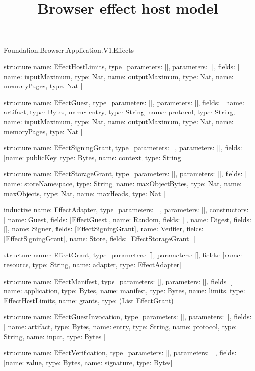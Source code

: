 \begin{lexlean}{Foundation.Browser.Application.V1.Effects}
\title{Browser effect host model}
\begin{semanticmodule}
structure{
  name: EffectHostLimits,
  type_parameters: [],
  parameters: [],
  fields: [
    {name: inputMaximum, type: Nat},
    {name: outputMaximum, type: Nat},
    {name: memoryPages, type: Nat}
  ]
}

structure{
  name: EffectGuest,
  type_parameters: [],
  parameters: [],
  fields: [
    {name: artifact, type: Bytes},
    {name: entry, type: String},
    {name: protocol, type: String},
    {name: inputMaximum, type: Nat},
    {name: outputMaximum, type: Nat},
    {name: memoryPages, type: Nat}
  ]
}

structure{
  name: EffectSigningGrant,
  type_parameters: [],
  parameters: [],
  fields: [{name: publicKey, type: Bytes}, {name: context, type: String}]
}

structure{
  name: EffectStorageGrant,
  type_parameters: [],
  parameters: [],
  fields: [
    {name: storeNamespace, type: String},
    {name: maxObjectBytes, type: Nat},
    {name: maxObjects, type: Nat},
    {name: maxHeads, type: Nat}
  ]
}

inductive{
  name: EffectAdapter,
  type_parameters: [],
  parameters: [],
  constructors: [
    {name: Guest, fields: [EffectGuest]},
    {name: Random, fields: []},
    {name: Digest, fields: []},
    {name: Signer, fields: [EffectSigningGrant]},
    {name: Verifier, fields: [EffectSigningGrant]},
    {name: Store, fields: [EffectStorageGrant]}
  ]
}

structure{
  name: EffectGrant,
  type_parameters: [],
  parameters: [],
  fields: [{name: resource, type: String}, {name: adapter, type: EffectAdapter}]
}

structure{
  name: EffectManifest,
  type_parameters: [],
  parameters: [],
  fields: [
    {name: application, type: Bytes},
    {name: manifest, type: Bytes},
    {name: limits, type: EffectHostLimits},
    {name: grants, type: (List EffectGrant)}
  ]
}

structure{
  name: EffectGuestInvocation,
  type_parameters: [],
  parameters: [],
  fields: [
    {name: artifact, type: Bytes},
    {name: entry, type: String},
    {name: protocol, type: String},
    {name: input, type: Bytes}
  ]
}

structure{
  name: EffectVerification,
  type_parameters: [],
  parameters: [],
  fields: [{name: value, type: Bytes}, {name: signature, type: Bytes}]
}


\end{semanticmodule}
\end{lexlean}
